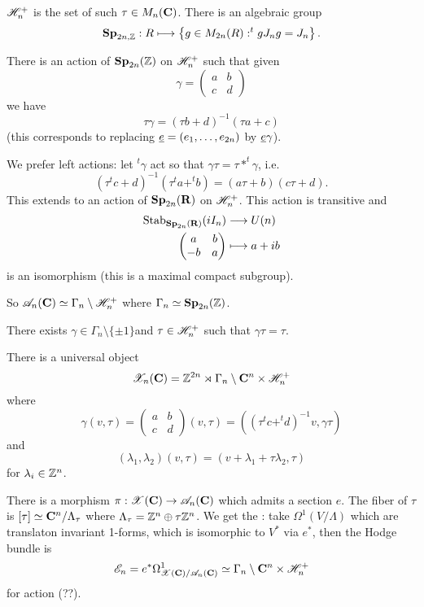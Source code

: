 \begin{definition}
	$\mathscr H_n^{+}$ is the set of such $\tau\in M_n(\mathbf{C})$. There is an algebraic group
	\[
	\Sp_{2n,\Z}:R \mapsto \left\{ g\in M_{2n}(R) : ^{t}gJ_ng = J_n \right\} 
	.\] 
\end{definition}
There is an action of $\mathbf{Sp}_{2n}(\mathbb Z)$ on $\mathscr H_n^{+}$ such that given
\[
	\gamma = \begin{pmatrix} a & b \\ c & d \end{pmatrix} 
\] 
we have
\[
\tau \gamma = (\tau b + d)^{-1}(\tau a + c)
\]
(this corresponds to replacing $\underline{e}=(e_1,\dots,e_{2n})$ by $\underline{e}\gamma$).

We prefer left actions: let $^{t}\gamma$ act so that $\gamma\tau = \tau*^{t}\gamma$, i.e.
\[
	(\tau^{t}c + d)^{-1}(\tau^{t}a+^{t}b) = (a\tau + b)(c\tau + d)
.\] 
This extends to an action of $\mathbf{Sp}_{2n}(\mathbf{R})$ on $\mathscr H_n^{+}$. This action is transitive and
\begin{align*}
	\operatorname{Stab}_{\mathbf{Sp}_{2n}(\mathbf{R})}(iI_n) &\longrightarrow U(n) \\
	\begin{pmatrix} a & b \\ -b & a \end{pmatrix}  &\longmapsto a + ib
\end{align*}
is an isomorphism (this is a maximal compact subgroup).

So $\mathscr{A}_n(\mathbf{C})\simeq \Gamma_n\setminus \mathscr H_n^{+}$ where $\Gamma_n\simeq \mathbf{Sp}_{2n}(\mathbb Z)$.
\begin{remark}
	There exists $\gamma\in \Gamma_n\setminus \{\pm 1\} $and $\tau\in \mathscr H_n^{+}$ such that $\gamma\tau=\tau$.
\end{remark}

There is a universal object
\[
	\mathscr{X}_n(\mathbf{C}) = \mathbb Z^{2n}\rtimes \Gamma_n\setminus\mathbf{C}^{n}\times \mathscr H_n^{+}
\] 
where
\[
	\gamma(v,\tau) = \begin{pmatrix} a & b \\ c & d \end{pmatrix} (v,\tau) = ((\tau^{t}c+^{t}d)^{-1}v, \gamma\tau)
\] 
and
\[
	(\lambda_1,\lambda_2)(v,\tau) = (v+\lambda_1+\tau\lambda_2,\tau)
\]
for $\lambda_i\in \mathbb Z^{n}$.

There is a morphism $\pi:\CX(\bb{C})\to \CA_n(\bb{C})$ which admits a section $e$. The fiber of $\tau$ is $[\tau]\simeq\mathbf{C}^{n} /\Lambda_\tau$ where $\Lambda_\tau = \mathbb Z^{n}\oplus\tau \mathbb Z^{n}$. We get the : take $\Omega^{1}(V /\Lambda)$ which are translaton invariant 1-forms, which is isomorphic to $V^{*}$ via $e^{*}$, then the Hodge bundle is
\[
	\mathscr{E}_n = e^{*}\Omega^{1}_{\mathscr{X}(\mathbf{C}) / \mathscr{A}_n(\mathbf{C})} \simeq \Gamma_n\setminus\mathbf{C}^{n}\times \mathscr H_n^{+}
\]
for action (??).

